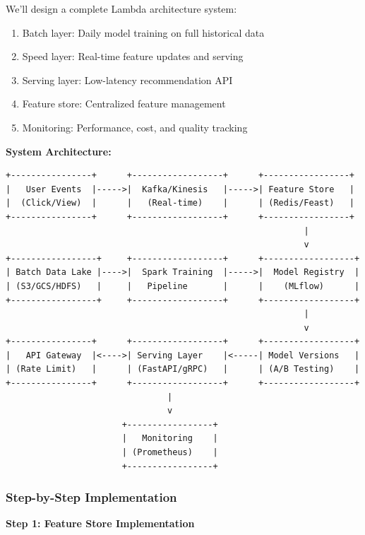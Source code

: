 We'll design a complete Lambda architecture system:
\begin{enumerate}
    \item Batch layer: Daily model training on full historical data
    \item Speed layer: Real-time feature updates and serving
    \item Serving layer: Low-latency recommendation API
    \item Feature store: Centralized feature management
    \item Monitoring: Performance, cost, and quality tracking
\end{enumerate}

\textbf{System Architecture:}

\begin{verbatim}
+----------------+      +------------------+      +-----------------+
|   User Events  |----->|  Kafka/Kinesis   |----->| Feature Store   |
|  (Click/View)  |      |   (Real-time)    |      | (Redis/Feast)   |
+----------------+      +------------------+      +-----------------+
                                                           |
                                                           v
+-----------------+     +------------------+      +------------------+
| Batch Data Lake |---->|  Spark Training  |----->|  Model Registry  |
| (S3/GCS/HDFS)   |     |   Pipeline       |      |    (MLflow)      |
+-----------------+     +------------------+      +------------------+
                                                           |
                                                           v
+----------------+      +------------------+      +------------------+
|   API Gateway  |<---->| Serving Layer    |<-----| Model Versions   |
| (Rate Limit)   |      | (FastAPI/gRPC)   |      | (A/B Testing)    |
+----------------+      +------------------+      +------------------+
                                |
                                v
                       +-----------------+
                       |   Monitoring    |
                       | (Prometheus)    |
                       +-----------------+
\end{verbatim}

\subsubsection{Step-by-Step Implementation}

\textbf{Step 1: Feature Store Implementation}

